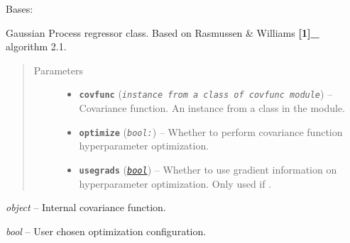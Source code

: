 \documentclass[letterpaper,10pt,english]{sphinxmanual}
\begin{document}
\begin{fulllineitems}
\label{pyGPGO.surrogates.GaussianProcess:pyGPGO.surrogates.GaussianProcess.GaussianProcess}
Bases: \href{https://docs.python.org/2/library/functions.html\#object}{}

Gaussian Process regressor class. Based on Rasmussen \& Williams {\color{red}\bfseries{}{[}1{]}\_} algorithm 2.1.
\begin{quote}\begin{description}
\item[{Parameters}] \leavevmode\begin{itemize}
\item {} 
\textbf{\texttt{covfunc}} (\emph{\texttt{instance from a class of covfunc module}}) -- Covariance function. An instance from a class in the  module.

\item {} 
\textbf{\texttt{optimize}} (\emph{\texttt{bool:}}) -- Whether to perform covariance function hyperparameter optimization.

\item {} 
\textbf{\texttt{usegrads}} (\href{https://docs.python.org/2/library/functions.html\#bool}{\emph{\texttt{bool}}}) -- Whether to use gradient information on hyperparameter optimization. Only used
if .

\end{itemize}

\end{description}\end{quote}

\begin{fulllineitems}
\label{pyGPGO.surrogates.GaussianProcess:pyGPGO.surrogates.GaussianProcess.GaussianProcess.covfunc}
\emph{object} -- Internal covariance function.

\end{fulllineitems}


\begin{fulllineitems}
\label{pyGPGO.surrogates.GaussianProcess:pyGPGO.surrogates.GaussianProcess.GaussianProcess.optimize}
\emph{bool} -- User chosen optimization configuration.


\end{fulllineitems}
\end{fulllineitems}
\end{document}
